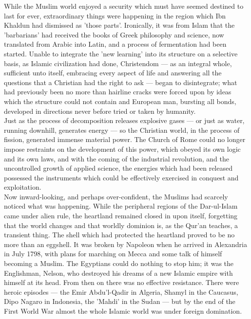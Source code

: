 \documentclass[10pt, twoside]{book}
\begin{document}
While the Muslim world enjoyed a security which must have seemed destined to last for ever, extraordinary things were happening in the region which Ibn Khaldun had dismissed as 'those parts'. Ironically, it was from Islam that the 'barbarians' had received the books of Greek philosophy and science, now translated from Arabic into Latin, and a process of fermentation had been started. Unable to integrate the 'new learning' into its structure on a selective basis, as Islamic civilization had done, Christendom --- as an integral whole, sufficient unto itself, embracing every aspect of life and answering all the questions that a Christian had the right to ask --- began to disintegrate; what had previously been no more than hairline cracks were forced upon by ideas which the structure could not contain and European man, bursting all bonds, developed in directions never before tried or taken by humanity. \\

Just as the process of decomposition releases explosive gases --- or just as water, running downhill, generates energy --- so the Christian world, in the process of fission, generated immense material power. The Church of Rome could no longer impose restraints on the development of this power, which obeyed its own logic and its own laws, and with the coming of the industrial revolution, and the uncontrolled growth of applied science, the energies which had been released possessed the instruments which could be effectively exercised in conquest and exploitation. \\

Now inward\hyp{}looking, and perhaps over\hyp{}confident, the Muslims had scarcely noticed what was happening. While the peripheral regions of the Dar\hyp{}ul\hyp{}Islam came under alien rule, the heartland remained closed in upon itself, forgetting that the world changes and that worldly dominion is, as the Qur'an teaches, a transient thing. The shell which had protected the heartland proved to be no more than an eggshell. It was broken by Napoleon when he arrived in Alexandria in July 1798, with plans for marching on Mecca and some talk of himself becoming a Muslim. The Egyptians could do nothing to stop him; it was the Englishman, Nelson, who destroyed his dreams of a new Islamic empire with himself at its head. From then on there was no effective resistance. There were heroic episodes --- the Emir Abdu'l\hyp{}Qadir in Algeria, Shamyl in the Caucasus, Dipo Nagaro in Indonesia, the 'Mahdi' in the Sudan --- but by the end of the First World War almost the whole Islamic world was under foreign domination. \\
\end{document}
